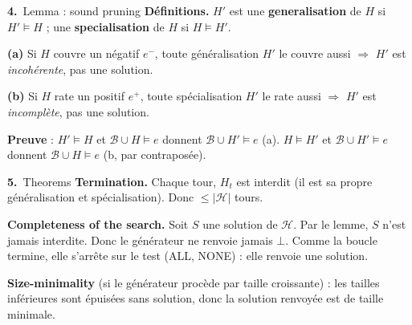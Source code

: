 \documentclass[10pt]{article}
\newcommand{\num}[1]{\textcolor{marine}{\textbf{#1.}}~}
\begin{document}
\begin{minipage}[t]{0.5\textwidth}
\begin{bloc}{\num{4}Lemma : sound pruning}
\textbf{Définitions.} $H'$ est une \textbf{generalisation} de $H$ si $H'\models H$ ; une \textbf{specialisation} de $H$ si $H\models H'$.\par\vspace{2pt}
\textbf{(a)} Si $H$ couvre un négatif $e^-$, toute généralisation $H'$ le couvre aussi $\Rightarrow$ $H'$ est \emph{incohérente}, pas une solution.\par\vspace{2pt}
\textbf{(b)} Si $H$ rate un positif $e^+$, toute spécialisation $H'$ le rate aussi $\Rightarrow$ $H'$ est \emph{incomplète}, pas une solution.\par\vspace{2pt}
\textbf{Preuve} : $H'\models H$ et $\mathcal{B}\cup H\models e$ donnent $\mathcal{B}\cup H'\models e$ (a). $H\models H'$ et $\mathcal{B}\cup H'\models e$ donnent $\mathcal{B}\cup H\models e$ (b, par contraposée).
\end{bloc}
\end{minipage}\hfill
\begin{minipage}[t]{0.48\textwidth}
\begin{bloc}{\num{5}Theorems}
\textbf{Termination.} Chaque tour, $H_t$ est interdit (il est sa propre généralisation et spécialisation). Donc $\le|\mathcal{H}|$ tours.\par\vspace{3pt}
\textbf{Completeness of the search.} Soit $S$ une solution de $\mathcal{H}$. Par le lemme, $S$ n'est jamais interdite. Donc le générateur ne renvoie jamais $\bot$. Comme la boucle termine, elle s'arrête sur le test (ALL, NONE) : elle renvoie une solution.\par\vspace{3pt}
\textbf{Size-minimality} (si le générateur procède par taille croissante) : les tailles inférieures sont épuisées sans solution, donc la solution renvoyée est de taille minimale.
\end{bloc}
\end{minipage}

\vspace{4pt}
\end{document}
